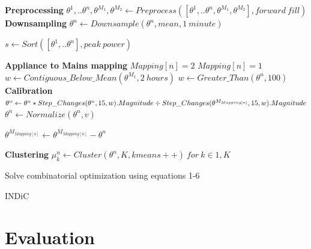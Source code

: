 \documentclass[conference]{IEEEtran}
\begin{document}
\begin{algorithm}
\DontPrintSemicolon %
\BlankLine
\textbf{Preprocessing}\;
\BlankLine
\nl$\theta^1,..\theta^n,\theta^{M_1},\theta^{M_2} \gets Preprocess([\theta^1,..\theta^n,\theta^{M_1},\theta^{M_2}],forward\: fill)$\;
\BlankLine
\textbf{Downsampling}
\BlankLine
\nl {}
	{
	$\theta^n \gets Downsample(\theta^n,mean,1\: minute)$\;
	}


\nl $s \gets Sort([\theta^1,..\theta^n],peak\: power)$\;

\nl {}
	{
	\BlankLine
	\textbf{Appliance to Mains mapping}\;
	\BlankLine
\nl	{} 
		{ $Mapping[n]=2$\;		
		}  
\nl	{}
		{ $Mapping[n]=1$\;
		}
\nl	{}
		{
\nl		$w \gets Contiguous\_Below\_Mean (\theta^{M_1}, 2\: hours)$\;
		}
\nl	{}
		{
		$w \gets Greater\_Than(\theta^n,100)$
		}
\nl	{}
	\BlankLine
	\textbf{Calibration} \;
	\BlankLine
\nl	$\theta^n \gets \theta^n * Step\_Changes(\theta^n,15,w).Magnitude  \linebreak
			\div Step\_Changes(\theta^{M_{Mapping[n]}},15,w).Magnitude $ \;
\nl	$\theta^n \gets Normalize(\theta^n,v)$\; 
	
\nl	$\theta^{M_{Mapping[n]}} \gets \theta^{M_{Mapping[n]}} - \theta^n $ \;
	
	\BlankLine
	\textbf{Clustering}\;
	\BlankLine
\nl	$\mu_k^n \gets Cluster(\theta^n,K,kmeans++) \: for\: k \in {1,K} $\;

	
	}
\nl Solve combinatorial optimization using equations 1-6

\nl {}\;
\caption{INDiC}
\label{algo:main}
\end{algorithm}

\section{Evaluation}
\end{document}
